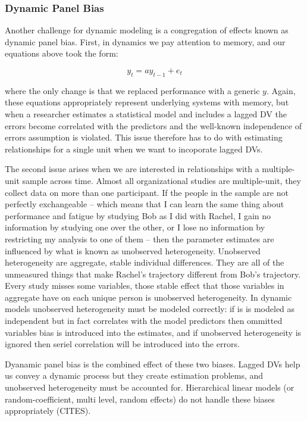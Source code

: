 \documentclass[english,,man]{apa6}
\theoremstyle{definition}
\theoremstyle{definition}
\theoremstyle{definition}
\theoremstyle{remark}
\begin{document}
\hypertarget{dynamic-panel-bias}{%
\subsubsection{Dynamic Panel Bias}\label{dynamic-panel-bias}}

Another challenge for dynamic modeling is a congregation of effects
known as dynamic panel bias. First, in dynamics we pay attention to
memory, and our equations above took the form:

\begin{equation}
y_{t} = a y_{t-1} + e_{t}
\end{equation}

\noindent where the only change is that we replaced performance with a
generic \(y\). Again, these equations appropriately represent underlying
systems with memory, but when a researcher estimates a statistical model
and includes a lagged DV the errors become correlated with the
predictors and the well-known independence of errors assumption is
violated. This issue therefore has to do with estimating relationships
for a single unit when we want to incoporate lagged DVs.

The second issue arises when we are interested in relationships with a
multiple-unit sample across time. Almost all organizational studies are
multiple-unit, they collect data on more than one participant. If the
people in the sample are not perfectly exchangeable -- which means that
I can learn the same thing about performance and fatigue by studying Bob
as I did with Rachel, I gain no information by studying one over the
other, or I lose no information by restricting my analysis to one of
them -- then the parameter estimates are influenced by what is known as
unobserved heterogeneity. Unobserved heterogeneity are aggregate, stable
individual differences. They are all of the unmeasured things that make
Rachel's trajectory different from Bob's trajectory. Every study misses
some variables, those stable effect that those variables in aggregate
have on each unique person is unobserved heterogeneity. In dynamic
models unobserved heterogeneity must be modeled correctly: if is is
modeled as independent but in fact correlates with the model predictors
then ommitted variables bias is introduced into the estimates, and if
unobserved heterogeneity is ignored then seriel correlation will be
introduced into the errors.

Dyanamic panel bias is the combined effect of these two biases. Lagged
DVs help us convey a dynamic process but they create estimation
problems, and unobserved heterogeneity must be accounted for.
Hierarchical linear models (or random-coefficient, multi level, random
effects) do not handle these biases appropriately (CITES).
\end{document}
